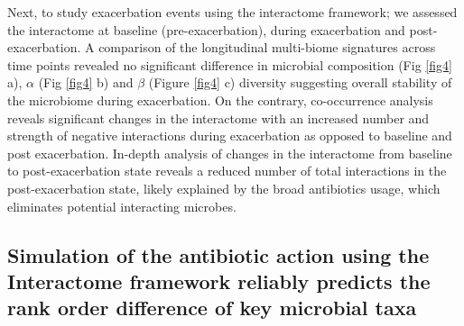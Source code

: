 Next, to study exacerbation events using the interactome framework; we assessed the interactome at baseline (pre-exacerbation), during exacerbation and post-exacerbation. A comparison of the longitudinal multi-biome signatures across time points revealed no significant difference in microbial composition (Fig \ref{fig4} a), $\alpha$ (Fig \ref{fig4} b) and $\beta$ (Figure \ref{fig4} c) diversity suggesting overall stability of the microbiome during exacerbation. On the contrary, co-occurrence analysis reveals significant changes in the interactome with an increased number and strength of negative interactions during exacerbation as opposed to baseline and post exacerbation. In-depth analysis of changes in the interactome from baseline to post-exacerbation state reveals a reduced number of total interactions in the post-exacerbation state, likely explained by the broad antibiotics usage, which eliminates potential interacting microbes.\\

\subsection{Simulation of the antibiotic action using the Interactome framework reliably predicts the rank order difference of key microbial taxa}

